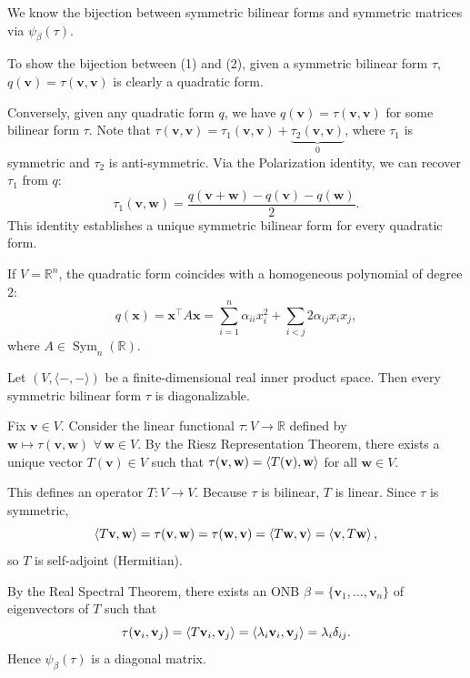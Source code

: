 \begin{pfbox}
We know the bijection between symmetric bilinear forms and symmetric matrices via $\psi_\beta(\tau)$.

To show the bijection between (1) and (2), given a symmetric bilinear form $\tau$,
$q(\mathbf{v})=\tau(\mathbf{v},\mathbf{v})$ is clearly a quadratic form.

Conversely, given any quadratic form $q$, we have $q(\mathbf{v})=\tau(\mathbf{v},\mathbf{v})$ for some bilinear form $\tau$.
Note that $\tau(\mathbf{v},\mathbf{v})=\tau_1(\mathbf{v},\mathbf{v})+\underbrace{\tau_2(\mathbf{v},\mathbf{v})}_{0}$,
where $\tau_1$ is symmetric and $\tau_2$ is anti-symmetric.
Via the Polarization identity, we can recover $\tau_1$ from $q$:
\[
\tau_1(\mathbf{v},\mathbf{w})
=
\frac{q(\mathbf{v}+\mathbf{w})-q(\mathbf{v})-q(\mathbf{w})}{2}.
\]
This identity establishes a unique symmetric bilinear form for every quadratic form.
\end{pfbox}

\begin{remark}
If $V=\mathbb{R}^n$, the quadratic form coincides with a homogeneous polynomial of degree $2$:
\[
q(\mathbf{x})
=
\mathbf{x}^\top A\mathbf{x}
=
\sum_{i=1}^n \alpha_{ii}x_i^2
+
\sum_{i<j}2\alpha_{ij}x_ix_j,
\]
where $A\in \operatorname{Sym}_n(\mathbb{R})$.
\end{remark}


\begin{theorem}
Let $(V,\langle -,-\rangle)$ be a finite-dimensional real inner product space. Then every symmetric bilinear form $\tau$ is diagonalizable.
\label{Diagonalization of symmetric bilinear forms}
\end{theorem}

\begin{pfbox}
Fix $\mathbf{v}\in V$. Consider the linear functional
$\tau: V\to\mathbb{R}$ defined by $\mathbf{w}\mapsto\tau(\mathbf{v},\mathbf{w})\,\,\forall\,\mathbf{w}\in V$.
By the Riesz Representation Theorem, there exists a unique vector $T(\mathbf{v})\in V$ such that
$\tau(\mathbf{v},\mathbf{w})=\left\langle T(\mathbf{v}), \mathbf{w} \right\rangle$
for all $\mathbf{w}\in V$.

This defines an operator $T:V\to V$.
Because $\tau$ is bilinear, $T$ is linear. Since $\tau$ is symmetric,
\[
\left\langle T\mathbf{v}, \mathbf{w} \right\rangle
=
\tau(\mathbf{v},\mathbf{w})
=
\tau(\mathbf{w},\mathbf{v})
=
\left\langle T\mathbf{w}, \mathbf{v} \right\rangle
=
\left\langle \mathbf{v}, T\mathbf{w} \right\rangle,
\]
so $T$ is self-adjoint (Hermitian).

By the Real Spectral Theorem, there exists an ONB $\beta=\{\mathbf{v}_1,\dots,\mathbf{v}_n\}$ of eigenvectors of $T$ such that
\[
\tau(\mathbf{v}_i,\mathbf{v}_j)
=
\left\langle T\mathbf{v}_i, \mathbf{v}_j \right\rangle
=
\left\langle \lambda_i\mathbf{v}_i, \mathbf{v}_j \right\rangle
=
\lambda_i\delta_{ij}.
\]
Hence $\psi_\beta(\tau)$ is a diagonal matrix.
\end{pfbox}

